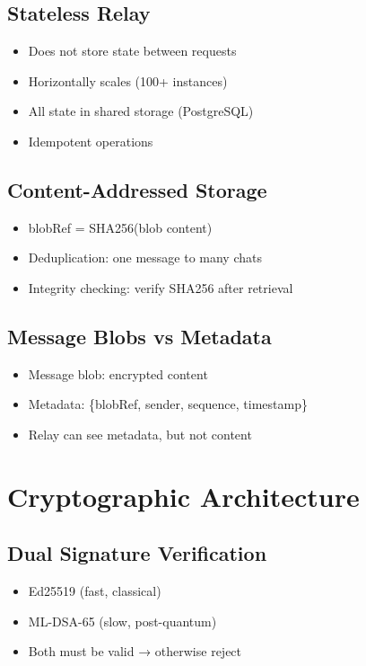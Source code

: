 \documentclass[11pt,a4paper,oneside]{book}
\begin{document}
\vspace{-0.2cm}\subsection{Stateless Relay}
\begin{itemize}
  \item Does not store state between requests
  \item Horizontally scales (100+ instances)
  \item All state in shared storage (PostgreSQL)
  \item Idempotent operations
\end{itemize}
\vspace{-0.2cm}\subsection{Content-Addressed Storage}
\begin{itemize}
  \item blobRef = SHA256(blob content)
  \item Deduplication: one message to many chats
  \item Integrity checking: verify SHA256 after retrieval
\end{itemize}
\vspace{-0.2cm}\subsection{Message Blobs vs Metadata}
\begin{itemize}
  \item Message blob: encrypted content
  \item Metadata: \{blobRef, sender, sequence, timestamp\}
  \item Relay can see metadata, but not content
\end{itemize}
\vspace{-0.3cm}\section{Cryptographic Architecture}
\vspace{-0.2cm}\subsection{Dual Signature Verification}
\begin{itemize}
  \item Ed25519 (fast, classical)
  \item ML-DSA-65 (slow, post-quantum)
  \item Both must be valid → otherwise reject
\end{itemize}
\end{document}
